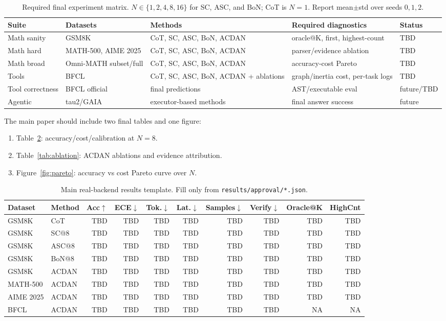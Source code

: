 \documentclass[letterpaper]{article} %
\begin{document}
\begin{table}[t]
\centering
\caption{Required final experiment matrix. $N\in\{1,2,4,8,16\}$ for SC, ASC,
and BoN; CoT is $N=1$. Report mean$\pm$std over seeds $0,1,2$.}
\label{tab:matrix}
\begin{tabular}{@{}lllll@{}}
\toprule
Suite & Datasets & Methods & Required diagnostics & Status \\
\midrule
Math sanity & GSM8K & CoT, SC, ASC, BoN, ACDAN & oracle@K, first, highest-count & TBD \\
Math hard & MATH-500, AIME 2025 & CoT, SC, ASC, BoN, ACDAN & parser/evidence ablation & TBD \\
Math broad & Omni-MATH subset/full & CoT, SC, ASC, BoN, ACDAN & accuracy-cost Pareto & TBD \\
Tools & BFCL & CoT, SC, ASC, BoN, ACDAN + ablations & graph/inertia cost, per-task logs & TBD \\
Tool correctness & BFCL official & final predictions & AST/executable eval & future/TBD \\
Agentic & tau2/GAIA & executor-based methods & final answer success & future \\
\bottomrule
\end{tabular}
\end{table}

The main paper should include two final tables and one figure:
\begin{enumerate}
\item Table~\ref{tab:mainresults}: accuracy/cost/calibration at $N=8$.
\item Table~\ref{tab:ablation}: ACDAN ablations and evidence attribution.
\item Figure~\ref{fig:pareto}: accuracy vs cost Pareto curve over $N$.
\end{enumerate}

\begin{table}[t]
\centering
\caption{Main real-backend results template. Fill only from
\texttt{results/approval/*.json}.}
\label{tab:mainresults}
\begin{tabular}{@{}llrrrrrrrr@{}}
\toprule
Dataset & Method & Acc$\uparrow$ & ECE$\downarrow$ & Tok.$\downarrow$ & Lat.$\downarrow$ & Samples$\downarrow$ & Verify$\downarrow$ & Oracle@K & HighCnt \\
\midrule
GSM8K & CoT & TBD & TBD & TBD & TBD & TBD & TBD & TBD & TBD \\
GSM8K & SC@8 & TBD & TBD & TBD & TBD & TBD & TBD & TBD & TBD \\
GSM8K & ASC@8 & TBD & TBD & TBD & TBD & TBD & TBD & TBD & TBD \\
GSM8K & BoN@8 & TBD & TBD & TBD & TBD & TBD & TBD & TBD & TBD \\
GSM8K & ACDAN & TBD & TBD & TBD & TBD & TBD & TBD & TBD & TBD \\
MATH-500 & ACDAN & TBD & TBD & TBD & TBD & TBD & TBD & TBD & TBD \\
AIME 2025 & ACDAN & TBD & TBD & TBD & TBD & TBD & TBD & TBD & TBD \\
BFCL & ACDAN & TBD & TBD & TBD & TBD & TBD & TBD & NA & NA \\
\bottomrule
\end{tabular}
\end{table}
\end{document}
